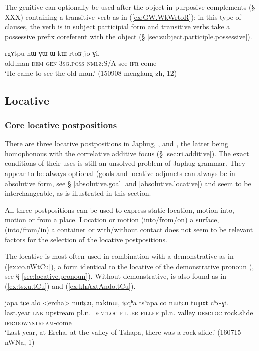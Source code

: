 The genitive  can optionally be used after the object in purposive complements (§ XXX) containing a transitive verb as in (\ref{ex:GW.WkWrtoR}); in this type of clauses, the verb is in subject participial form and transitive verbs take a possessive prefix coreferent with the object (§ \ref{sec:subject.participle.possessive}).

\begin{exe}
\ex \label{ex:GW.WkWrtoR}
\gll rgɤtpu nɯ ɣɯ ɯ-kɯ-rtoʁ jo-ɣi. \\
old.man \textsc{dem} \textsc{gen} \textsc{3sg}.\textsc{poss}-\textsc{nmlz}:S/A-see \textsc{ifr}-come \\
\glt `He came to see the old man.' (150908 menglang-zh, 12)
\end{exe}

\subsection{Locative} \label{sec:locative}
 

\subsubsection{Core locative postpositions} \label{sec:core.locative}
There are three locative postpositions in Japhug, ,  and , the latter being homophonous with the correlative additive focus  (§ \ref{sec:ri.additive}). The exact conditions of their uses is still an unsolved problem of Japhug grammar. They appear to be always optional (goals and locative adjuncts can always be in absolutive form, see § \ref{absolutive.goal}  and \ref{absolutive.locative}) and seem to be interchangeable, as is illustrated in this section.

All three postpositions can be used to express static location, motion into, motion or from a place. Location or motion (into/from/on) a surface, (into/from/in) a container or with/without contact does not seem to be relevant factors for the selection of the locative postpositions.

The locative   is most often used in combination with a demonstrative  as in (\ref{ex:co.nWtCu}), a form identical to the locative of the demonstrative pronoun (, see § \ref{sec:locative.pronoun}). Without demonstrative,  is also found as in (\ref{ex:tsxu.tCu}) and (\ref{ex:khAxtAndo.tCu}).

\begin{exe}
\ex \label{ex:co.nWtCu}
\gll japa tɕe alo <ercha> nɯtɕu, nɤkinɯ, iɕqʰa tsʰapa co nɯtɕu tɯɲɤt cʰɤ-ɣi. \\
last.year \textsc{lnk} upstream pl.n. \textsc{dem}:\textsc{loc} \textsc{filler}   \textsc{filler}  pl.n. valley \textsc{dem}:\textsc{loc} rock.slide \textsc{ifr}:\textsc{downstream}-come \\
\glt `Last year, at Ercha, at the valley of Tshapa, there was a rock slide.' (160715 nWNa, 1)
\end{exe}

